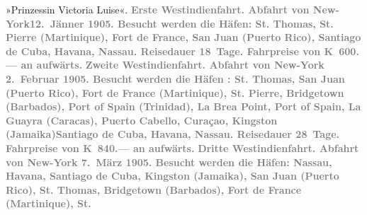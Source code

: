 \begin{ledgroupsized}[t]{13cm}
{{                  »Prinzessin Victoria Luise«.}}\pend
           \pstart
           \noindent{}\textcolor{gray}{\textbf{\textbf{Erste Westindienfahrt.} Abfahrt von New-York\textbf{12. Jänner 1905}. Besucht werden die Häfen: St. Thomas,
                     St. Pierre (Martinique), Fort de France, San Juan
                     (Puerto Rico), Santiago de Cuba, Havana, Nassau. Reisedauer 18 Tage. Fahrpreise von \textbf{K 600.—}
                  an aufwärts.}}\pend
           \pstart
           \textcolor{gray}{\textbf{\textbf{Zweite Westindienfahrt.} Abfahrt von New-York { }\textbf{2. Februar 1905}. Besucht werden die Häfen : St.
                  Thomas, San Juan (Puerto Rico), Fort de France (Martinique), St. Pierre, Bridgetown
                     (Barbados), Port of Spain
                  (Trinidad), La Brea Point, Port of Spain, La Guayra (Caracas), Puerto Cabello, Curaçao, Kingston (Jamaika)Santiago de Cuba, Havana, Nassau.
                  Reisedauer 28 Tage. Fahrpreise von \textbf{K 840.—} an aufwärts.}}\pend
           \pstart
           \textcolor{gray}{\textbf{\textbf{Dritte Westindienfahrt.} Abfahrt von New-York { }\textbf{7. März 1905}. Besucht werden die Häfen: Nassau, Havana, Santiago de Cuba, Kingston
                     (Jamaika), San Juan (Puerto Rico),
                     St. Thomas, Bridgetown (Barbados), Fort de France (Martinique), St.
}}
\end{ledgroupsized}
